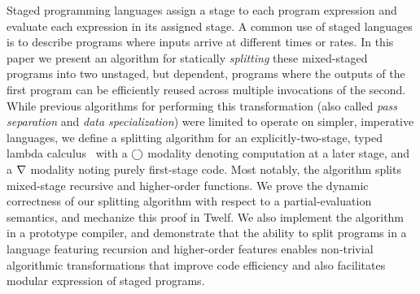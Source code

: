 
Staged programming languages assign a stage to each program expression
and evaluate each expression in its assigned stage. A common use of
staged languages is to describe programs where inputs arrive at
different times or rates. In this paper we present an algorithm for
statically {\em splitting} these mixed-staged programs into two
unstaged, but dependent, programs where the outputs of the first
program can be efficiently reused across multiple invocations of the
second. While previous algorithms for performing this transformation
(also called \emph{pass separation} and \emph{data specialization})
were limited to operate on simpler, imperative languages, we define a
splitting algorithm for an explicitly-two-stage, typed lambda
calculus \lang\ with a $\bigcirc$ modality denoting computation at a later
stage, and a $\nabla$ modality noting purely first-stage code.  Most
notably, the algorithm splits mixed-stage recursive and higher-order
functions.  We prove the dynamic correctness of our splitting
algorithm with respect to a partial-evaluation semantics, and
mechanize this proof in Twelf. We also implement the algorithm
in a prototype compiler, and demonstrate that the ability to split
programs in a language featuring recursion and higher-order features
enables non-trivial algorithmic transformations that
improve code efficiency and also facilitates modular 
expression of staged programs.

